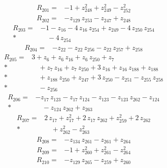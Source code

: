 \documentclass[10pt]{article}
\begin{document}
\begin{align*}
R_{201}={}& - 1 + z_{248}^{2} + z_{249}^{2} - z_{252}^{2}
\end{align*}
\begin{align*}
R_{202}={}& - z_{129}\,z_{253} - z_{247} + z_{248}
\end{align*}
\begin{align*}
R_{203}={}& - 1 - z_{16} - 4\,z_{16}\,z_{254} + z_{249} - 4\,z_{250}\,z_{254} \\*
&\quad - 4\,z_{254}
\end{align*}
\begin{align*}
R_{204}={}& - z_{22} - z_{22}\,z_{256} - z_{22}\,z_{257} + z_{258}
\end{align*}
\begin{align*}
R_{205}={}& 3 + z_{6} + z_{6}\,z_{16} + z_{6}\,z_{250} + z_{7} \\*
&\quad + z_{7}\,z_{16} + z_{7}\,z_{250} + 3\,z_{16} + z_{16}\,z_{188} + z_{188} \\*
&\quad + z_{188}\,z_{250} + z_{247} + 3\,z_{250} - z_{251} - z_{255}\,z_{258} \\*
&\quad - z_{256}
\end{align*}
\begin{align*}
R_{206}={}& - z_{17}\,z_{123} - z_{17}\,z_{124} - z_{123} - z_{123}\,z_{262} - z_{124} \\*
&\quad - z_{124}\,z_{262} + z_{263}
\end{align*}
\begin{align*}
R_{207}={}& 2\,z_{17} + z_{17}^{2} + 2\,z_{17}\,z_{262} + z_{259}^{2} + 2\,z_{262} \\*
&\quad + z_{262}^{2} - z_{263}^{2}
\end{align*}
\begin{align*}
R_{208}={}& - z_{134}\,z_{261} - z_{261} + z_{264}
\end{align*}
\begin{align*}
R_{209}={}& - 1 + z_{260}^{2} + z_{261}^{2} - z_{264}^{2}
\end{align*}
\begin{align*}
R_{210}={}& - z_{129}\,z_{265} - z_{259} + z_{260}
\end{align*}
\end{document}
